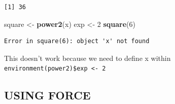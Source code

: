 \documentclass[]{book}
\newenvironment{Shaded}{\begin{snugshade}}{\end{snugshade}}
\newcommand{\DecValTok}[1]{\textcolor[rgb]{0.00,0.00,0.81}{#1}}
\newcommand{\KeywordTok}[1]{\textcolor[rgb]{0.13,0.29,0.53}{\textbf{#1}}}
\newcommand{\NormalTok}[1]{#1}
\newcommand{\StringTok}[1]{\textcolor[rgb]{0.31,0.60,0.02}{#1}}
\begin{document}
\begin{verbatim}
[1] 36
\end{verbatim}

\begin{Shaded}
\begin{Highlighting}[]
\NormalTok{square <-}\StringTok{ }\KeywordTok{power2}\NormalTok{(x)}
\NormalTok{exp <-}\StringTok{ }\DecValTok{2}
\KeywordTok{square}\NormalTok{(}\DecValTok{6}\NormalTok{)}
\end{Highlighting}
\end{Shaded}

\begin{verbatim}
Error in square(6): object 'x' not found
\end{verbatim}

This doesn't work because we need to define x within \texttt{environment(power2)\$exp\ \textless{}-\ 2}

\hypertarget{using-force}{%
\subsection{USING FORCE}\label{using-force}}
\end{document}
